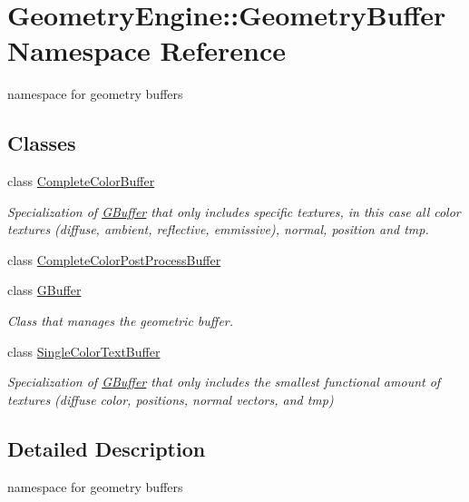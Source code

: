 \hypertarget{namespace_geometry_engine_1_1_geometry_buffer}{}\section{Geometry\+Engine\+::Geometry\+Buffer Namespace Reference}
\label{namespace_geometry_engine_1_1_geometry_buffer}


namespace for geometry buffers  


\subsection*{Classes}
\begin{DoxyCompactItemize}
\item 
class \mbox{\hyperlink{class_geometry_engine_1_1_geometry_buffer_1_1_complete_color_buffer}{Complete\+Color\+Buffer}}
\begin{DoxyCompactList}\small\item\em Specialization of \mbox{\hyperlink{class_geometry_engine_1_1_geometry_buffer_1_1_g_buffer}{G\+Buffer}} that only includes specific textures, in this case all color textures (diffuse, ambient, reflective, emmissive), normal, position and tmp. \end{DoxyCompactList}\item 
class \mbox{\hyperlink{class_geometry_engine_1_1_geometry_buffer_1_1_complete_color_post_process_buffer}{Complete\+Color\+Post\+Process\+Buffer}}
\item 
class \mbox{\hyperlink{class_geometry_engine_1_1_geometry_buffer_1_1_g_buffer}{G\+Buffer}}
\begin{DoxyCompactList}\small\item\em Class that manages the geometric buffer. \end{DoxyCompactList}\item 
class \mbox{\hyperlink{class_geometry_engine_1_1_geometry_buffer_1_1_single_color_text_buffer}{Single\+Color\+Text\+Buffer}}
\begin{DoxyCompactList}\small\item\em Specialization of \mbox{\hyperlink{class_geometry_engine_1_1_geometry_buffer_1_1_g_buffer}{G\+Buffer}} that only includes the smallest functional amount of textures (diffuse color, positions, normal vectors, and tmp) \end{DoxyCompactList}\end{DoxyCompactItemize}


\subsection{Detailed Description}
namespace for geometry buffers 